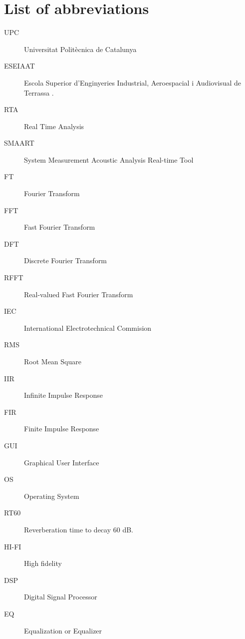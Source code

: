 \chapter*{List of abbreviations}

\begin{description}
	\item[UPC] Universitat Politècnica de Catalunya
	\item[ESEIAAT] Escola Superior d’Enginyeries Industrial, Aeroespacial i Audiovisual de Terrassa \cite{eseiaat}.
	\item[RTA] Real Time Analysis
	\item[SMAART] System Measurement Acoustic Analysis Real-time Tool
	\item[FT] Fourier Transform
	\item[FFT] Fast Fourier Transform
	\item[DFT] Discrete Fourier Transform
	\item[RFFT] Real-valued Fast Fourier Transform
	\item[IEC] International Electrotechnical Commision
	\item[RMS] Root Mean Square
	\item[IIR] Infinite Impulse Response
	\item[FIR] Finite Impulse Response
	\item[GUI] Graphical User Interface
	\item[OS] Operating System
	\item[RT60] Reverberation time to decay 60 dB.
	\item[HI-FI] High fidelity
	\item[DSP] Digital Signal Processor
	\item[EQ] Equalization or Equalizer

\end{description}